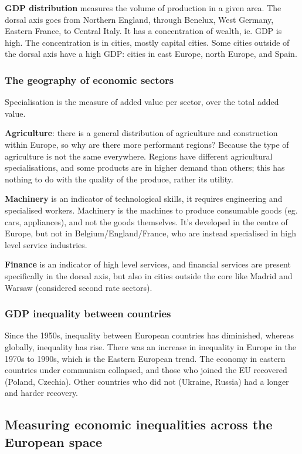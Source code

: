 \documentclass{article}
\begin{document}
\textbf{GDP distribution} measures the volume of production in a given area. The dorsal axis goes from Northern England, through Benelux, West Germany, Eastern France, to Central Italy. It has a concentration of wealth, ie. GDP is high.
The concentration is in cities, mostly capital cities. Some cities outside of the dorsal axis have a high GDP: cities in east Europe, north Europe, and Spain.

\subsubsection{The geography of economic sectors}

Specialisation is the measure of added value per sector, over the total added value.

\textbf{Agriculture}: there is a general distribution of agriculture and construction within Europe, so why are there more performant regions? Because the type of agriculture is not the same everywhere. Regions have different agricultural specialisations, and some products are in higher demand than others; this has nothing to do with the quality of the produce, rather its utility.

\textbf{Machinery} is an indicator of technological skills, it requires engineering and specialised workers. Machinery is the machines to produce consumable goods (eg. cars, appliances), and not the goods themselves. It's developed in the centre of Europe, but not in Belgium/England/France, who are instead specialised in high level service industries.

\textbf{Finance} is an indicator of high level services, and financial services are present specifically in the dorsal axis, but also in cities outside the core like Madrid and Warsaw (considered second rate sectors).

\subsubsection{GDP inequality between countries}

Since the 1950s, inequality between European countries has diminished, whereas globally, inequality has rise. There was an increase in inequality in Europe in the 1970s to 1990s, which is the Eastern European trend. The economy in eastern countries under communism collapsed, and those who joined the EU recovered (Poland, Czechia). Other countries who did not (Ukraine, Russia) had a longer and harder recovery.

\subsection{Measuring economic inequalities across the European space}
\end{document}
